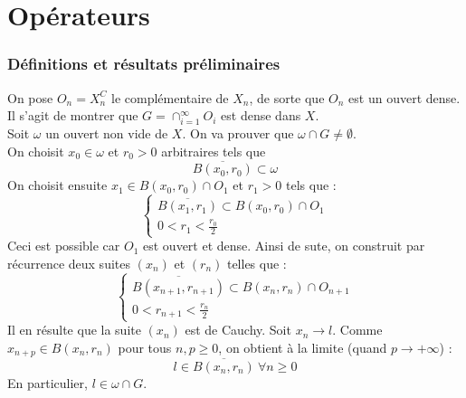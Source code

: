 \part{Opérateurs}
\section{Définitions et résultats préliminaires}


\begin{dem}
	On pose $O_n=X_n^C$ le complémentaire de $X_n$, de sorte que $O_n$ est un ouvert dense. Il s'agit de montrer que $G=\cap_{i=1}^\infty O_i$ est dense dans $X$.\\
	Soit $\omega$ un ouvert non vide de $X$. On va prouver que $\omega\cap G\neq\emptyset$. \\
	On choisit $x_0\in\omega$ et $r_0>0$ arbitraires tels que \[\overline{B(x_0,r_0)}\subset\omega\]
	On choisit ensuite $x_1\in B(x_0,r_0)\cap O_1$ et $r_1>0$ tels que : 
	\[\left\{\begin{array}{c}
		\overline{B(x_1,r_1)}\subset B(x_0,r_0)\cap O_1\\
		0<r_1<\frac{r_0}{2}
	\end{array}\right.\]
	Ceci est possible car $O_1$ est ouvert et dense. Ainsi de sute, on construit par récurrence deux suites $(x_n)$ et $(r_n)$ telles que :	
	\[\left\{\begin{array}{c}
		\overline{B(x_{n+1},r_{n+1})}\subset B(x_n,r_n)\cap O_{n+1}\\
		0<r_{n+1}<\frac{r_n}{2}
	\end{array}\right.\]
	Il en résulte que la suite $(x_n)$ est de Cauchy. Soit $x_n\to l$. Comme $x_{n+p}\in B(x_n,r_n)$ pour tous $n, p\geq 0$, on obtient à la limite (quand $p\to +\infty$) :
	\[l\in \overline{B(x_n,r_n)}\ \forall n\geq 0\]
	En particulier, $l\in \omega\cap G$.
\end{dem}


